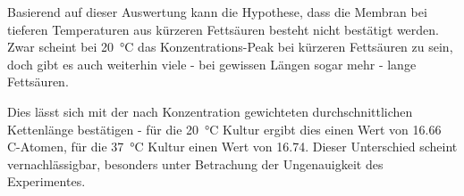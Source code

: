 \documentclass[a4paper,english]{scrreprt}
\begin{document}
Basierend auf dieser Auswertung kann die Hypothese, dass die Membran bei
tieferen Temperaturen aus kürzeren Fettsäuren besteht nicht bestätigt werden.
Zwar scheint bei \SI{20}{\celsius} das Konzentrations-Peak bei kürzeren
Fettsäuren zu sein, doch gibt es auch weiterhin viele - bei gewissen Längen
sogar mehr - lange Fettsäuren.

Dies lässt sich mit der nach Konzentration gewichteten durchschnittlichen
Kettenlänge bestätigen - für die \SI{20}{\celsius} Kultur ergibt dies einen
Wert von 16.66 C-Atomen, für die \SI{37}{\celsius} Kultur einen Wert von 16.74.
Dieser Unterschied scheint vernachlässigbar, besonders unter Betrachung der
Ungenauigkeit des Experimentes.




\end{document}
